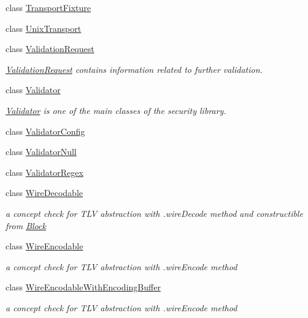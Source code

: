 \begin{DoxyCompactItemize}
class \hyperlink{classndn_1_1TransportFixture}{Transport\+Fixture}
\item 
class \hyperlink{classndn_1_1UnixTransport}{Unix\+Transport}
\item 
class \hyperlink{classndn_1_1ValidationRequest}{Validation\+Request}
\begin{DoxyCompactList}\small\item\em \hyperlink{classndn_1_1ValidationRequest}{Validation\+Request} contains information related to further validation. \end{DoxyCompactList}\item 
class \hyperlink{classndn_1_1Validator}{Validator}
\begin{DoxyCompactList}\small\item\em \hyperlink{classndn_1_1Validator}{Validator} is one of the main classes of the security library. \end{DoxyCompactList}\item 
class \hyperlink{classndn_1_1ValidatorConfig}{Validator\+Config}
\item 
class \hyperlink{classndn_1_1ValidatorNull}{Validator\+Null}
\item 
class \hyperlink{classndn_1_1ValidatorRegex}{Validator\+Regex}
\item 
class \hyperlink{classndn_1_1WireDecodable}{Wire\+Decodable}
\begin{DoxyCompactList}\small\item\em a concept check for T\+LV abstraction with .wire\+Decode method and constructible from \hyperlink{classndn_1_1Block}{Block} \end{DoxyCompactList}\item 
class \hyperlink{classndn_1_1WireEncodable}{Wire\+Encodable}
\begin{DoxyCompactList}\small\item\em a concept check for T\+LV abstraction with .wire\+Encode method \end{DoxyCompactList}\item 
class \hyperlink{classndn_1_1WireEncodableWithEncodingBuffer}{Wire\+Encodable\+With\+Encoding\+Buffer}
\begin{DoxyCompactList}\small\item\em a concept check for T\+LV abstraction with .wire\+Encode method \end{DoxyCompactList}\end{DoxyCompactItemize}
